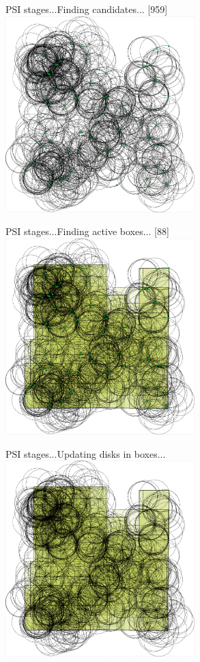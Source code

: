 \documentclass{beamer}
\begin{document}
\begin{frame}{PSI stages...}{Finding candidates... [959]}
    \centering
    \includegraphics[width=0.55\textwidth]{figures/psi2}
\end{frame}

\begin{frame}{PSI stages...}{Finding active boxes... [88]}
    \centering
    \includegraphics[width=0.55\textwidth]{figures/psi3}
\end{frame}

\begin{frame}{PSI stages...}{Updating disks in boxes...}
    \centering
    \includegraphics[width=0.55\textwidth]{figures/psi4}
\end{frame}
\end{document}
